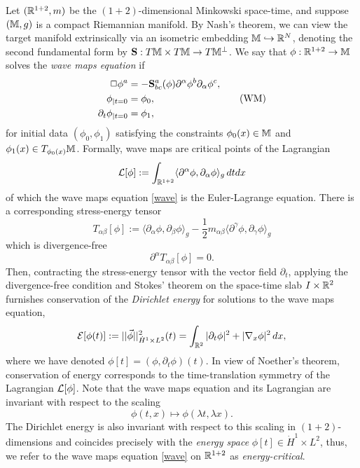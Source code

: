 Let $(\mathbb R^{1 + 2}, m)$ be the $(1 + 2)$-dimensional Minkowski space-time, and suppose $(\mathbb M, g)$ is a compact Riemannian manifold. By Nash's theorem, we can view the target manifold extrinsically via an isometric embedding $\mathbb M \hookrightarrow \mathbb R^N$, denoting the second fundamental form by ${\bf S}  : T\mathbb M \times T\mathbb M \to T \mathbb M^\perp$. We say that $\phi : \mathbb R^{1 + 2} \to \mathbb M$ solves the \emph{wave maps equation} if 
\begin{equation}
	\begin{split}
		\Box \phi^a 
			&= - {\bf S} ^a_{bc} (\phi)  \partial^\alpha \phi^b \partial_\alpha \phi^c, \\
		\phi_{|t = 0}
			&= \phi_0 ,\\
		\partial_t \phi_{|t = 0}
			&= \phi_1,	
	\end{split}
	\label{eq:wave}
	\tag{WM}
\end{equation}
for initial data $(\phi_0, \phi_1)$ satisfying the constraints $\phi_0 (x) \in \mathbb M$ and $\phi_1 (x) \in T_{\phi_0 (x)} \mathbb M$. Formally, wave maps are critical points of the Lagrangian
	\[ \mathcal L [\phi] := \int_{\mathbb R^{1 + 2}} \langle\partial^\alpha \phi, \partial_\alpha \phi \rangle_g \, dt dx \]
of which the wave maps equation \eqref{wave} is the Euler-Lagrange equation. There is a corresponding stress-energy tensor 
	\[ 
		T_{\alpha\beta} [\phi] := \langle \partial_\alpha \phi, \partial_\beta \phi \rangle_g  - \frac12 m_{\alpha \beta} \langle \partial^\gamma \phi, \partial_\gamma \phi \rangle_g
	 \]
which is divergence-free
	\[ \partial^\alpha T_{\alpha \beta} [\phi] = 0. \]
Then, contracting the stress-energy tensor with the vector field $\partial_t$, applying the divergence-free condition and Stokes' theorem on the space-time slab $I \times \mathbb R^2$ furnishes conservation of the \emph{Dirichlet energy} for solutions to the wave maps equation, 
	\[ \mathcal E[\phi (t)] := ||\vec \phi||_{\dot H^1 \times L^2}^2 (t) = \int_{\mathbb R^2} |\partial_t \phi|^2 + |\nabla_x \phi|^2 \, dx , \]
where we have denoted $\phi[t]= (\phi, \partial_t \phi) (t)$. In view of Noether's theorem, conservation of energy corresponds to the time-translation symmetry of the Lagrangian $\mathcal L [\phi]$. Note that the wave maps equation and its Lagrangian are invariant with respect to the scaling 
	\[ \phi(t, x) \mapsto \phi(\lambda t, \lambda x). \]
The Dirichlet energy is also invariant with respect to this scaling in $(1 + 2)$-dimensions and coincides precisely with the \emph{energy space} $\phi [t] \in \dot H^1 \times L^2$, thus, we refer to the wave maps equation \eqref{wave} on $\mathbb R^{1 + 2}$ as \emph{energy-critical}. 

